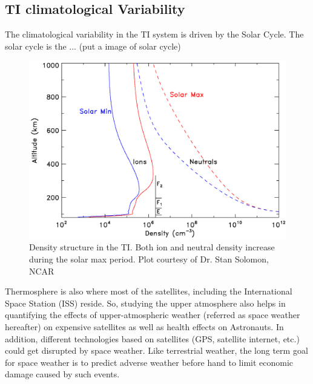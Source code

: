 \subsection{TI climatological Variability}
The climatological variability in the TI system is driven by the Solar Cycle. The solar cycle is the ... (put a image of solar cycle)
\begin{figure}[t]
	\centering\includegraphics[width=35pc]{slr_minmax_slm.png}
	\caption{Density structure in the TI. Both ion and neutral density increase during the solar max period. Plot courtesy of Dr. Stan Solomon, NCAR }
	\label{fig:TI density variability}
\end{figure}


Thermosphere is also where most of the satellites, including the International Space Station (ISS) reside. So, studying the upper atmosphere also helps in quantifying the effects of upper-atmospheric weather (referred as space weather hereafter) on expensive satellites as well as health effects on Astronauts. In addition, different technologies based on satellites (GPS, satellite internet, etc.) could get disrupted by space weather. Like terrestrial weather, the long term goal for space weather is to predict adverse weather before hand to limit economic damage caused by such events.


